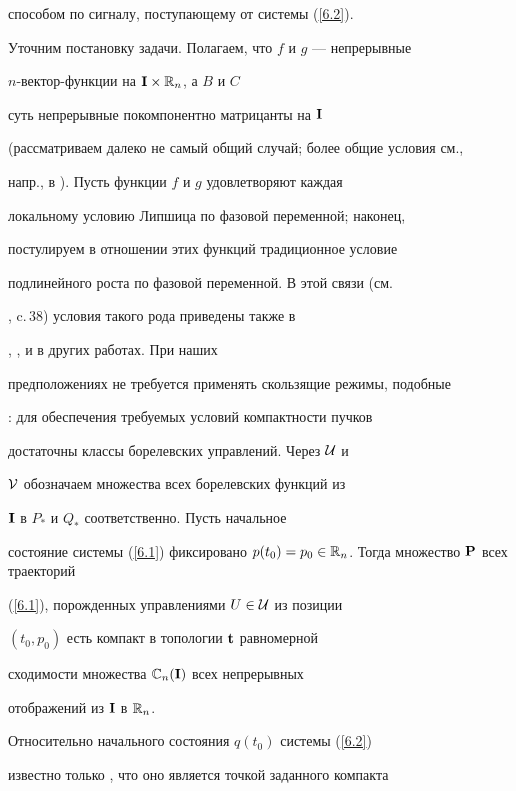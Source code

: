 способом по сигналу, поступающему от системы (\ref{6.2}).





Уточним постановку задачи. Полагаем, что $f$ и $g$ --- непрерывные


$n$-век\-тор-функ\-ции на $\bold{I} \times \Bbb{R}_n$, а $B$ и $C$


суть непрерывные покомпонентно матрицанты на $\bold{I}$


(рассматриваем далеко не самый общий случай; более общие условия см.,


напр., в \cite{13}). Пусть функции $f$ и $g$ удовлетворяют каждая


локальному условию Липшица по фазовой переменной; наконец,


постулируем в отношении этих функций традиционное условие


подлинейного роста по фазовой переменной. В этой связи (см.


\cite{4}, c.\,38) условия такого рода приведены также в


\cite{3}, \cite{5}, \cite{6} и в других работах. При наших


предположениях не требуется применять скользящие режимы, подобные


\cite{14}: для обеспечения требуемых условий компактности пучков


достаточны классы борелевских управлений. Через $\cal{U}$ и


$\cal{V}$ обозначаем множества всех борелевских функций из


$\bold{I}$ в $P_*$ и $Q_*$ соответственно. Пусть начальное


состояние системы (\ref{6.1}) фиксировано ${p(t_0)} = {p_0} \in


{\Bbb{R}}_n$. Тогда множество $\bold{P}$ всех траекторий


(\ref{6.1}), порожденных управлениями $U \in \cal{U}$ из позиции


$({t_0},{p_0})$ есть компакт в топологии $\bold{t}$ равномерной


сходимости множества $\Bbb{C}_n(\bold{I})$ всех непрерывных


отображений из $\bold{I}$ в $\Bbb{R}_n$.





Относительно начального состояния $q(t_0)$ системы (\ref{6.2})


известно только , что оно является точкой заданного компакта


